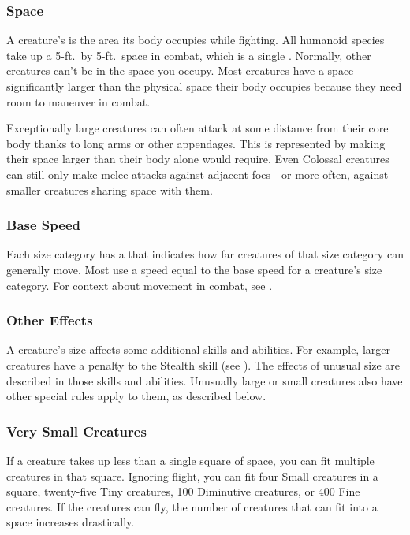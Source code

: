     \subsubsection{Space}\label{Space}
      A creature's  is the area its body occupies while fighting.
      All humanoid species take up a 5-ft.\ by 5-ft.\ space in combat, which is a single .
      Normally, other creatures can't be in the space you occupy.
      Most creatures have a space significantly larger than the physical space their body occupies because they need room to maneuver in combat.

      Exceptionally large creatures can often attack at some distance from their core body thanks to long arms or other appendages.
      This is represented by making their space larger than their body alone would require.
      Even Colossal creatures can still only make melee attacks against adjacent foes - or more often, against smaller creatures sharing space with them.

    \subsubsection{Base Speed}\label{Base Speed}
      Each size category has a  that indicates how far creatures of that size category can generally move.
      Most  use a speed equal to the base speed for a creature's size category.
      For context about movement in combat, see .

    \subsubsection{Other Effects}
      A creature's size affects some additional skills and abilities.
      For example, larger creatures have a penalty to the Stealth skill (see ).
      The effects of unusual size are described in those skills and abilities.
      Unusually large or small creatures also have other special rules apply to them, as described below.

    \subsubsection{Very Small Creatures}
       If a creature takes up less than a single square of space, you can fit multiple creatures in that square.
      Ignoring flight, you can fit four Small creatures in a square, twenty-five Tiny creatures, 100 Diminutive creatures, or 400 Fine creatures.
      If the creatures can fly, the number of creatures that can fit into a space increases drastically.

